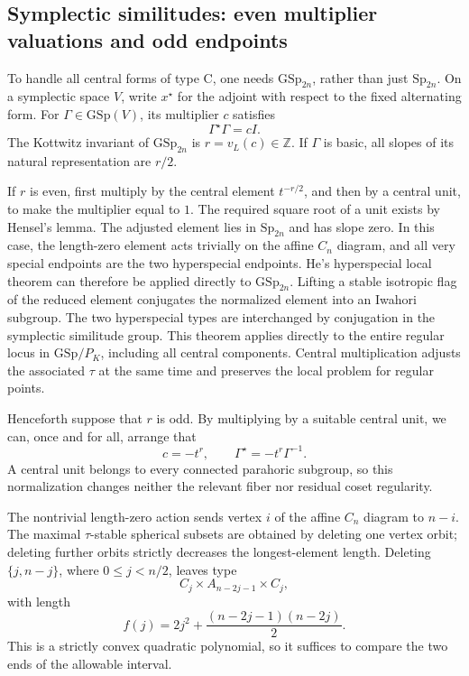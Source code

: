 \documentclass[11pt,a4paper]{article}
\theoremstyle{definition}
\theoremstyle{remark}
\begin{document}
\subsection{Symplectic similitudes: even multiplier valuations and odd
endpoints}\label{subsec:ac-gsp-endpoints}

To handle all central forms of type C, one needs
\(\mathrm{GSp}_{2n}\), rather than just \(\mathrm{Sp}_{2n}\). On a
symplectic space \(V\), write \(x^\star\) for the adjoint with respect to
the fixed alternating form. For \(\Gamma\in\mathrm{GSp}(V)\), its
multiplier \(c\) satisfies
\[
\Gamma^\star\Gamma=cI.
\]
The Kottwitz invariant of \(\mathrm{GSp}_{2n}\) is
\(r=v_L(c)\in\mathbb Z\). If \(\Gamma\) is basic, all slopes of its natural
representation are \(r/2\).

If \(r\) is even, first multiply by the central element \(t^{-r/2}\), and
then by a central unit, to make the multiplier equal to \(1\). The
required square root of a unit exists by Hensel's lemma. The adjusted
element lies in \(\mathrm{Sp}_{2n}\) and has slope zero. In this case,
the length-zero element acts trivially on the affine \(C_n\) diagram,
and all very special endpoints are the two hyperspecial endpoints.
He's hyperspecial local theorem can therefore be applied directly to
\(\mathrm{GSp}_{2n}\). Lifting a stable isotropic flag of the reduced
element conjugates the normalized element into an Iwahori subgroup.
The two hyperspecial types are interchanged by conjugation in the
symplectic similitude group. This theorem applies directly to the entire
regular locus in \(\mathrm{GSp}/P_K\), including all central components.
Central multiplication adjusts the associated \(\tau\) at the same
time and preserves the local problem for regular points.

Henceforth suppose that \(r\) is odd. By multiplying by a suitable
central unit, we can, once and for all, arrange that
\[
c=-t^r,\qquad \Gamma^\star=-t^r\Gamma^{-1}.
\]
A central unit belongs to every connected parahoric subgroup, so this
normalization changes neither the relevant fiber nor residual coset
regularity.

The nontrivial length-zero action sends vertex \(i\) of the affine
\(C_n\) diagram to \(n-i\). The maximal \(\tau\)-stable spherical subsets
are obtained by deleting one vertex orbit; deleting further orbits
strictly decreases the longest-element length. Deleting
\(\{j,n-j\}\), where \(0\leq j<n/2\), leaves type
\[
C_j\times A_{n-2j-1}\times C_j,
\]
with length
\[
f(j)=2j^2+\frac{(n-2j-1)(n-2j)}2.
\]
This is a strictly convex quadratic polynomial, so it suffices to
compare the two ends of the allowable interval.
\end{document}
